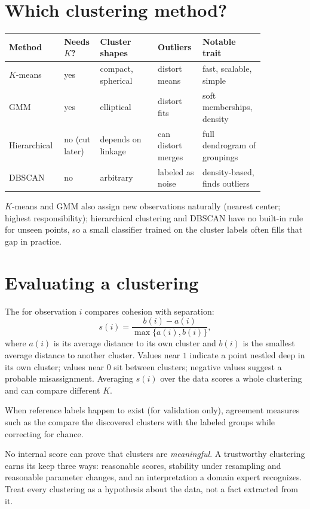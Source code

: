 \section{Which clustering method?}

\begin{mltable}
\begin{tabular}{@{}p{0.16\linewidth}p{0.12\linewidth}p{0.21\linewidth}p{0.14\linewidth}p{0.22\linewidth}@{}}
\toprule
\rowcolor{MLPaleBlue!92}
Method & Needs $K$? & Cluster shapes & Outliers & Notable trait \\
\midrule
$K$-means & yes & compact, spherical & distort means & fast, scalable, simple \\
GMM & yes & elliptical & distort fits & soft memberships, density \\
Hierarchical & no (cut later) & depends on linkage & can distort merges & full dendrogram of groupings \\
DBSCAN & no & arbitrary & labeled as noise & density-based, finds outliers \\
\bottomrule
\end{tabular}
\end{mltable}

$K$-means and GMM also assign new observations naturally (nearest center; highest responsibility); hierarchical clustering and DBSCAN have no built-in rule for unseen points, so a small classifier trained on the cluster labels often fills that gap in practice.

\section{Evaluating a clustering}

The  for observation $i$ compares cohesion with separation:
\[
  s(i)=\frac{b(i)-a(i)}{\max\{a(i),b(i)\}},
\]
where $a(i)$ is its average distance to its own cluster and $b(i)$ is the smallest average distance to another cluster. Values near $1$ indicate a point nestled deep in its own cluster; values near $0$ sit between clusters; negative values suggest a probable misassignment. Averaging $s(i)$ over the data scores a whole clustering and can compare different $K$.

When reference labels happen to exist (for validation only), agreement measures such as the  compare the discovered clusters with the labeled groups while correcting for chance.

\begin{keyidea}
No internal score can prove that clusters are \emph{meaningful}. A trustworthy clustering earns its keep three ways: reasonable scores, stability under resampling and reasonable parameter changes, and an interpretation a domain expert recognizes. Treat every clustering as a hypothesis about the data, not a fact extracted from it.
\end{keyidea}

